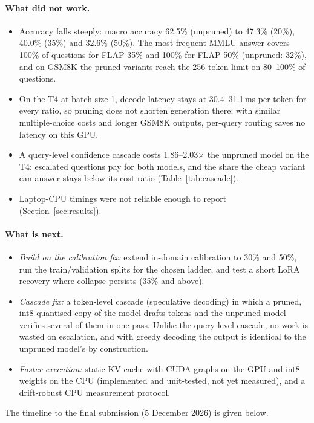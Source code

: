 \paragraph{What did not work.}
\begin{itemize}
\item Accuracy falls steeply: macro accuracy 62.5\% (unpruned) to 47.3\% (20\%), 40.0\% (35\%) and 32.6\% (50\%). The most frequent MMLU answer covers 100\% of questions for FLAP-35\% and 100\% for FLAP-50\% (unpruned: 32\%), and on GSM8K the pruned variants reach the 256-token limit on 80--100\% of questions.
\item On the T4 at batch size 1, decode latency stays at 30.4--31.1\,ms per token for every ratio, so pruning does not shorten generation there; with similar multiple-choice costs and longer GSM8K outputs, per-query routing saves no latency on this GPU.
\item A query-level confidence cascade costs 1.86--2.03$\times$ the unpruned model on the T4: escalated questions pay for both models, and the share the cheap variant can answer stays below its cost ratio (Table~\ref{tab:cascade}).
\item Laptop-CPU timings were not reliable enough to report (Section~\ref{sec:results}).
\end{itemize}
\paragraph{What is next.}
\begin{itemize}
\item \emph{Build on the calibration fix:} extend in-domain calibration to 30\% and 50\%, run the train/validation splits for the chosen ladder, and test a short LoRA recovery where collapse persists (35\% and above).
\item \emph{Cascade fix:} a token-level cascade (speculative decoding) in which a pruned, int8-quantised copy of the model drafts tokens and the unpruned model verifies several of them in one pass. Unlike the query-level cascade, no work is wasted on escalation, and with greedy decoding the output is identical to the unpruned model's by construction.
\item \emph{Faster execution:} static KV cache with CUDA graphs on the GPU and int8 weights on the CPU (implemented and unit-tested, not yet measured), and a drift-robust CPU measurement protocol.
\end{itemize}
The timeline to the final submission (5 December 2026) is given below.
